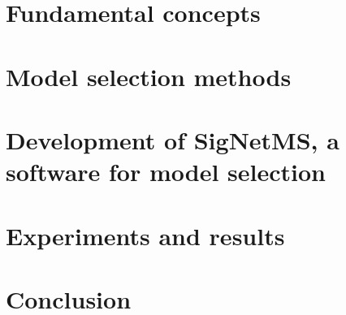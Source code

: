 \documentclass[12pt, twoside]{report}
\numberwithin{mydefinition}{section}
\numberwithin{mytheorem}{section}
\numberwithin{mylemma}{section}
\numberwithin{corollary}{section}
\begin{document}
\chapter{Fundamental concepts}
\label{chap:fundamental_concepts}


\chapter{Model selection methods}
\label{chap:model_selection}


\chapter{Development of SigNetMS, a software for model selection}
\label{chap:development_signetms}


\chapter{Experiments and results}
\label{chap:experiments}


\chapter{Conclusion}
\label{chap:conclusion}


\newpage
\printbibliography
\end{document}
